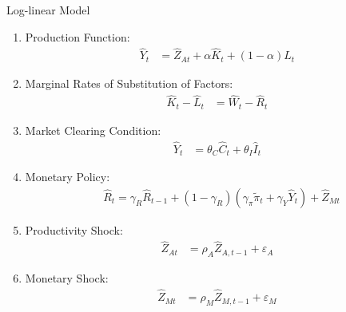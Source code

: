 \documentclass[../quali_slides.tex]{subfiles}
\begin{document}
\begin{frame}[allowframebreaks]{Log-linear Model}
\begin{enumerate}
		\item Production Function:
		\begin{align}
			\hat{Y}_t &= \hat{Z}_{At} + \alpha \hat{K}_t + (1-\alpha) \hat{L}_t %
		\end{align}
		
		
		\item Marginal Rates of Substitution of Factors:
		\begin{align}
			\hat{K}_t - \hat{L}_t &= \hat{W}_t - \hat{R}_t %
		\end{align}
		
		\item Market Clearing Condition:
		\begin{align}
			\hat{Y}_t &= \theta_C \hat{C}_t + \theta_I \hat{I}_t 
		\end{align}
		
		\item Monetary Policy:
		\begin{align}
			& \hat{R}_t = \gamma_R \hat{R}_{t-1} + (1-\gamma_R)(\gamma_\pi \widetilde{\pi}_t + \gamma_Y \hat{Y}_t) + \hat{Z}_{Mt} %
		\end{align}
		
		\item Productivity Shock:
		\begin{align}
			\hat{Z}_{At} &= \rho_A \hat{Z}_{A,t-1} + \varepsilon_{A} %
		\end{align}
		
		\item Monetary Shock:
		\begin{align}
			\hat{Z}_{Mt} &= \rho_M \hat{Z}_{M,t-1} + \varepsilon_{M} %
		\end{align}
		
	\end{enumerate}
	
\end{frame}
\end{document}
